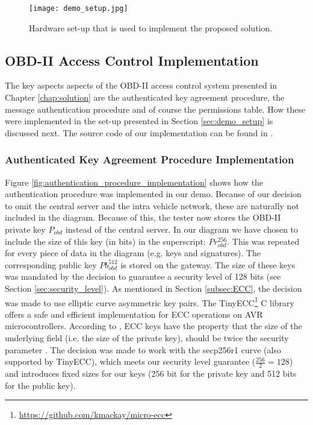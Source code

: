 \begin{figure}[h]
	\centering
	\texttt{[image: demo\_setup.jpg]}
	\caption{Hardware set-up that is used to implement the proposed solution.}
	\label{fig:demo}
\end{figure}

\subsection{OBD-II Access Control Implementation}
The key aspects aspects of the OBD-II access control system presented in Chapter \ref{chap:solution} are the authenticated key agreement procedure, the message authentication procedure and of course the permissions table. How these were implemented in the set-up presented in Section \ref{sec:demo_setup} is discussed next. The source code of our implementation can be found in \cite{Michel}.  

\subsubsection{Authenticated Key Agreement Procedure Implementation}
\label{subsec:authenticated_key_agreement_procedure_implementation}

Figure \ref{fig:authentication_procedure_implementation} shows how the authentication procedure was implemented in our demo. Because of our decision to omit the central server and the intra vehicle network, these are naturally not included in the diagram. Because of this, the tester now stores the OBD-II private key $P_{obd}$ instead of the central server. In our diagram we have chosen to include the size of this key (in bits) in the superscript: $Pr_{obd}^{256}$. This was repeated for every piece of data in the diagram (e.g. keys and signatures). The corresponding public key $Pb_{obd}^{512}$ is stored on the gateway. The size of these keys was mandated by the decision to guarantee a security level of 128 bits (see Section \ref{sec:security_level}). As mentioned in Section \ref{subsec:ECC}, the decision was made to use elliptic curve asymmetric key pairs. The TinyECC\footnote{\url{https://github.com/kmackay/micro-ecc}} C library offers a safe and efficient implementation for ECC operations on AVR microcontrollers. According to \cite{Siddiqui}, ECC keys have the property that the size of the underlying field (i.e. the size of the private key), should be twice the security parameter \cite{Siddiqui}. The decision was made to work with the secp256r1 curve (also supported by TinyECC), which meets our security level guarantee ($\frac{256}{2}=128$) and introduces fixed sizes for our keys (256 bit for the private key and 512 bits for the public key).

